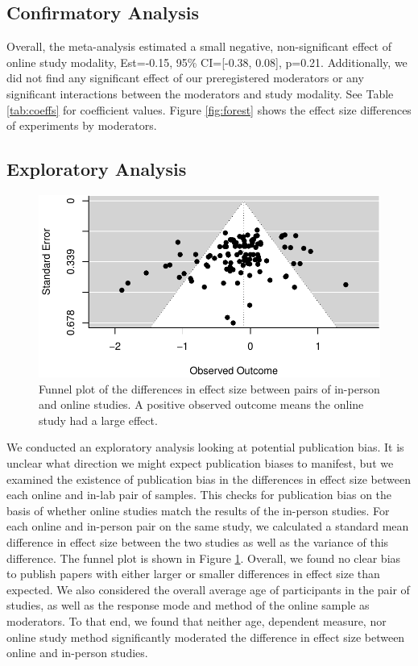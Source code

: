 \documentclass[
  man,floatsintext]{apa6}
\begin{document}
\hypertarget{confirmatory-analysis}{%
\subsection{Confirmatory Analysis}\label{confirmatory-analysis}}

Overall, the meta-analysis estimated a small negative, non-significant effect of online study modality, Est=-0.15, 95\% CI={[}-0.38, 0.08{]}, p=0.21. Additionally, we did not find any significant effect of our preregistered moderators or any significant interactions between the moderators and study modality. See Table \ref{tab:coeffs} for coefficient values. Figure \ref{fig:forest} shows the effect size differences of experiments by moderators.

\hypertarget{exploratory-analysis}{%
\subsection{Exploratory Analysis}\label{exploratory-analysis}}

\begin{figure}[h]

{\centering \includegraphics[width=0.8\linewidth]{OnlineMA_main_files/figure-latex/funnel-1} 

}

\caption{Funnel plot of the differences in effect size between pairs of in-person and online studies. A positive observed outcome means the online study had a large effect. \label{funnel}}\label{fig:funnel}
\end{figure}

We conducted an exploratory analysis looking at potential publication bias. It is unclear what direction we might expect publication biases to manifest, but we examined the existence of publication bias in the differences in effect size between each online and in-lab pair of samples. This checks for publication bias on the basis of whether online studies match the results of the in-person studies. For each online and in-person pair on the same study, we calculated a standard mean difference in effect size between the two studies as well as the variance of this difference. The funnel plot is shown in Figure \ref{fig:funnel}. Overall, we found no clear bias to publish papers with either larger or smaller differences in effect size than expected. We also considered the overall average age of participants in the pair of studies, as well as the response mode and method of the online sample as moderators. To that end, we found that neither age, dependent measure, nor online study method significantly moderated the difference in effect size between online and in-person studies.
\end{document}
